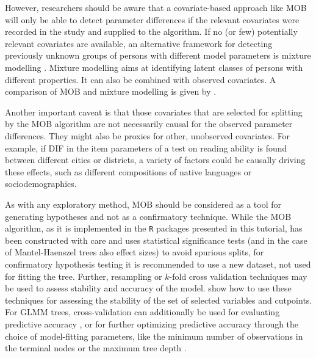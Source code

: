 \documentclass[doc,floatsintext,natbib]{apa7}
\begin{document}
However, researchers should be aware that a covariate-based approach like MOB will only be able to detect parameter differences if the relevant covariates were recorded in the study and supplied to the algorithm. If no (or few) potentially relevant covariates are available, an alternative framework for detecting previously unknown groups of persons with different model parameters is mixture modelling \citep[see, e.g.,][in the context of Rasch modelling]{AyalySant17,FriStrZei:2015:EaPM}. Mixture modelling aims at identifying latent classes of persons with different properties. It can also be combined with observed covariates. A comparison of MOB and mixture modelling is given by \citet{FriStrZei:2014}.

Another important caveat is that those covariates that are selected for splitting by the MOB algorithm are not necessarily causal for the observed parameter differences. They might also be proxies for other, unobserved covariates. For example, if DIF in the item parameters of a test on reading ability is found between different cities or districts, a variety of factors could be causally driving these effects, such as different compositions of native languages or sociodemographics. 

As with any exploratory method, MOB should be considered as a tool for generating hypotheses and not as a confirmatory technique. While the MOB algorithm, as it is implemented in the \texttt{R} packages presented in this tutorial, has been constructed with care and uses statistical significance tests (and in the case of Mantel-Haenszel trees also effect sizes) to avoid spurious splits, for confirmatory hypothesis testing it is recommended to use a new dataset, not used for fitting the tree. Further, resampling or $k$-fold cross validation techniques may be used to assess stability and accuracy of the model. \cite{PhilyRusc18} show how to use these techniques for assessing the stability of the set of selected variables and cutpoints. For GLMM trees, cross-validation can additionally be used for evaluating predictive accuracy \citep[e.g., ][]{RooiyWeed20}, or for further optimizing predictive accuracy through the choice of model-fitting parameters, like the minimum number of observations in the terminal nodes or the maximum tree depth \citep{JameyWitt23}.  

\end{document}
